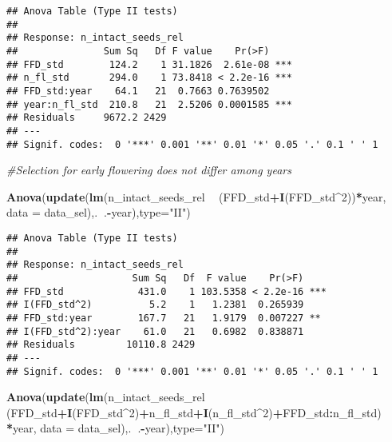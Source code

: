 \documentclass[]{article}
\newenvironment{Shaded}{\begin{snugshade}}{\end{snugshade}}
\newcommand{\KeywordTok}[1]{\textcolor[rgb]{0.13,0.29,0.53}{\textbf{#1}}}
\newcommand{\DataTypeTok}[1]{\textcolor[rgb]{0.13,0.29,0.53}{#1}}
\newcommand{\DecValTok}[1]{\textcolor[rgb]{0.00,0.00,0.81}{#1}}
\newcommand{\StringTok}[1]{\textcolor[rgb]{0.31,0.60,0.02}{#1}}
\newcommand{\CommentTok}[1]{\textcolor[rgb]{0.56,0.35,0.01}{\textit{#1}}}
\newcommand{\OperatorTok}[1]{\textcolor[rgb]{0.81,0.36,0.00}{\textbf{#1}}}
\newcommand{\NormalTok}[1]{#1}
\begin{document}
\begin{verbatim}
## Anova Table (Type II tests)
## 
## Response: n_intact_seeds_rel
##               Sum Sq   Df F value    Pr(>F)    
## FFD_std        124.2    1 31.1826  2.61e-08 ***
## n_fl_std       294.0    1 73.8418 < 2.2e-16 ***
## FFD_std:year    64.1   21  0.7663 0.7639502    
## year:n_fl_std  210.8   21  2.5206 0.0001585 ***
## Residuals     9672.2 2429                      
## ---
## Signif. codes:  0 '***' 0.001 '**' 0.01 '*' 0.05 '.' 0.1 ' ' 1
\end{verbatim}

\begin{Shaded}
\begin{Highlighting}[]
\CommentTok{#Selection for early flowering does not differ among years}

\KeywordTok{Anova}\NormalTok{(}\KeywordTok{update}\NormalTok{(}\KeywordTok{lm}\NormalTok{(n_intact_seeds_rel }\OperatorTok{~}\StringTok{ }\NormalTok{(FFD_std}\OperatorTok{+}\KeywordTok{I}\NormalTok{(FFD_std}\OperatorTok{^}\DecValTok{2}\NormalTok{))}\OperatorTok{*}\NormalTok{year, }\DataTypeTok{data =}\NormalTok{ data_sel),.}\OperatorTok{~}\NormalTok{.}\OperatorTok{-}\NormalTok{year),}\DataTypeTok{type=}\StringTok{"II"}\NormalTok{) }
\end{Highlighting}
\end{Shaded}

\begin{verbatim}
## Anova Table (Type II tests)
## 
## Response: n_intact_seeds_rel
##                    Sum Sq   Df  F value    Pr(>F)    
## FFD_std             431.0    1 103.5358 < 2.2e-16 ***
## I(FFD_std^2)          5.2    1   1.2381  0.265939    
## FFD_std:year        167.7   21   1.9179  0.007227 ** 
## I(FFD_std^2):year    61.0   21   0.6982  0.838871    
## Residuals         10110.8 2429                       
## ---
## Signif. codes:  0 '***' 0.001 '**' 0.01 '*' 0.05 '.' 0.1 ' ' 1
\end{verbatim}

\begin{Shaded}
\begin{Highlighting}[]
\KeywordTok{Anova}\NormalTok{(}\KeywordTok{update}\NormalTok{(}\KeywordTok{lm}\NormalTok{(n_intact_seeds_rel }\OperatorTok{~}\StringTok{ }\NormalTok{(FFD_std}\OperatorTok{+}\KeywordTok{I}\NormalTok{(FFD_std}\OperatorTok{^}\DecValTok{2}\NormalTok{)}\OperatorTok{+}\NormalTok{n_fl_std}\OperatorTok{+}\KeywordTok{I}\NormalTok{(n_fl_std}\OperatorTok{^}\DecValTok{2}\NormalTok{)}\OperatorTok{+}\NormalTok{FFD_std}\OperatorTok{:}\NormalTok{n_fl_std)}
                \OperatorTok{*}\NormalTok{year, }\DataTypeTok{data =}\NormalTok{ data_sel),.}\OperatorTok{~}\NormalTok{.}\OperatorTok{-}\NormalTok{year),}\DataTypeTok{type=}\StringTok{"II"}\NormalTok{) }
\end{Highlighting}
\end{Shaded}
\end{document}
